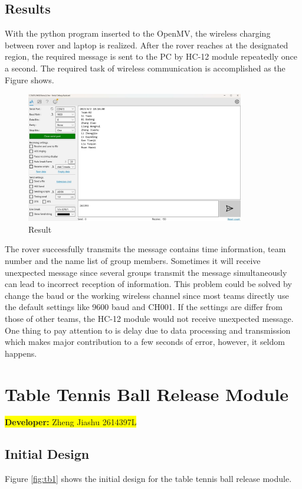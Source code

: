 \documentclass[12pt, a4paper, oneside]{report}
\begin{document}
\subsection{Results}
With the python program inserted to the OpenMV, the wireless charging between rover and laptop is realized. After the rover reaches at the designated region, the required message is sent to the PC by HC-12 module repeatedly once a second. The required task of wireless communication is accomplished as the Figure shows.

\begin{figure}[H]
  \centering
  \includegraphics[width=0.85\textwidth]{pic/HC12/hc12-10.png}
  \caption{Result}
  \label{fig:hc12-10}
\end{figure}

The rover successfully transmits the message contains time information, team number and the name list of group members. Sometimes it will receive unexpected message since several groups transmit the message simultaneously can lead to incorrect reception of information. This problem could be solved by change the baud or the working wireless channel since most teams directly use the default settings like 9600 baud and CH001. If the settings are differ from those of other teams, the HC-12 module would not receive unexpected message. One thing to pay attention to is delay due to data processing and transmission which makes major contribution to a few seconds of error, however, it seldom happens. 

\newpage
\section{Table Tennis Ball Release Module}\label{sec:tb}
\colorbox{yellow}{\textbf{Developer:} Zheng Jiashu 2614397L}

\subsection{Initial Design}
Figure \ref{fig:tb1} shows the initial design for the table tennis ball release module.
\end{document}
